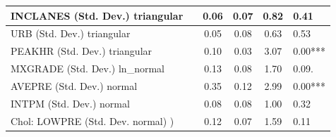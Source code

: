 \begin{table}
\begin{center}
\begin{tabular}{|l|l|c|c|c|l|}
			\hline
			INCLANES (Std. Dev.) triangular &  & 0.06 & 0.07 & 0.82 & 0.41 \\
			\hline
			URB (Std. Dev.) triangular &  & 0.05 & 0.08 & 0.63 & 0.53 \\
			\hline
			PEAKHR (Std. Dev.) triangular &  & 0.10 & 0.03 & 3.07 & 0.00*** \\
			\hline
			MXGRADE (Std. Dev.) ln_normal &  & 0.13 & 0.08 & 1.70 & 0.09. \\
			\hline
			AVEPRE (Std. Dev.) normal &  & 0.35 & 0.12 & 2.99 & 0.00*** \\
			\hline
			INTPM (Std. Dev.) normal &  & 0.08 & 0.08 & 1.00 & 0.32 \\
			\hline
			 Chol: LOWPRE (Std. Dev. normal) ) &  & 0.12 & 0.07 & 1.59 & 0.11 \\
			\hline
		\end{tabular}
	\end{center}
\end{table}